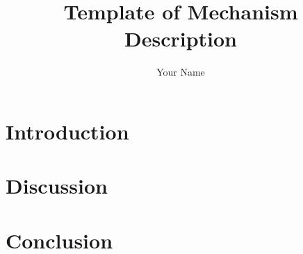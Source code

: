 \documentclass[12pt]{article}
\title{Template of Mechanism Description}
\author{Your Name}
\begin{document}
\maketitle

\section{Introduction} 



   

\section{Discussion}

\section{Conclusion}

%


\end{document}
